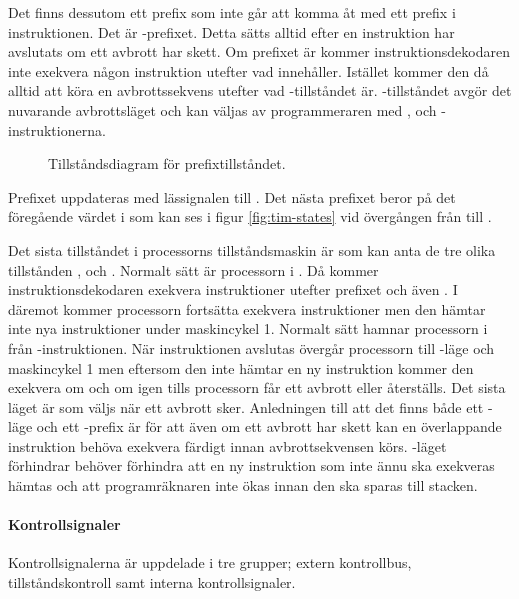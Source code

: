 \documentclass[main.tex]{subfiles}
\begin{document}
Det finns dessutom ett prefix som inte går att komma åt med ett prefix i
instruktionen. Det är -prefixet. Detta sätts alltid efter en
instruktion har avslutats om ett avbrott har skett. Om prefixet är 
kommer instruktionsdekodaren inte exekvera någon instruktion utefter vad
 innehåller. Istället kommer den då alltid att köra en avbrottssekvens
utefter vad -tillståndet är. -tillståndet avgör det
nuvarande avbrottsläget och kan väljas av programmeraren med ,
 och -instruktionerna.
\begin{figure}[H]
    \center
    
    \caption{Tillståndsdiagram för prefixtillståndet.}
    \label{fig:prefix}
\end{figure}
Prefixet uppdateras med lässignalen till . Det nästa prefixet beror på
det föregående värdet i  som kan ses i figur \ref{fig:tim-states} vid
övergången från  till .

Det sista tillståndet i processorns tillståndsmaskin är  som kan
anta de tre olika tillstånden ,  och .
Normalt sätt är processorn i . Då kommer instruktionsdekodaren
exekvera instruktioner utefter  prefixet och även . I
 däremot kommer processorn fortsätta exekvera instruktioner men den
hämtar inte nya instruktioner under maskincykel 1. Normalt sätt hamnar
processorn i  från -instruktionen. När 
instruktionen avslutas övergår processorn till -läge och
maskincykel 1 men eftersom den inte hämtar en ny instruktion kommer den
exekvera  om och om igen tills processorn får ett avbrott eller
återställs. Det sista läget är  som väljs när ett avbrott
sker. Anledningen till att det finns både ett -läge och ett
-prefix är för att även om ett avbrott har skett kan en överlappande
instruktion behöva exekvera färdigt innan avbrottsekvensen körs.
-läget förhindrar behöver förhindra att en ny instruktion som
inte ännu ska exekveras hämtas och att programräknaren inte ökas innan den ska
sparas till stacken.

\paragraph{Kontrollsignaler}
Kontrollsignalerna är uppdelade i tre grupper; extern kontrollbus,
tillståndskontroll samt interna kontrollsignaler.
\end{document}
